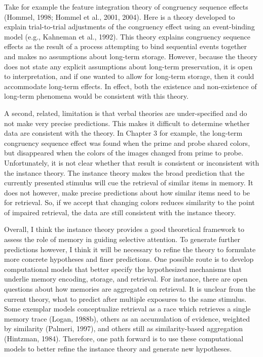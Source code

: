 \documentclass[]{DissertateCUNY}
\begin{document}
Take for example the feature integration theory of congruency sequence
effects (Hommel, 1998; Hommel et al., 2001, 2004). Here is a theory
developed to explain trial-to-trial adjustments of the congruency effect
using an event-binding model (e.g., Kahneman et al., 1992). This theory
explains congruency sequence effects as the result of a process
attempting to bind sequential events together and makes no assumptions
about long-term storage. However, because the theory does not state any
explicit assumptions about long-term preservation, it is open to
interpretation, and if one wanted to allow for long-term storage, then
it could accommodate long-term effects. In effect, both the existence
and non-existence of long-term phenomena would be consistent with this
theory.

A second, related, limitation is that verbal theories are
under-specified and do not make very precise predictions. This makes it
difficult to determine whether data are consistent with the theory. In
Chapter 3 for example, the long-term congruency sequence effect was
found when the prime and probe shared colors, but disappeared when the
colors of the images changed from prime to probe. Unfortunately, it is
not clear whether that result is consistent or inconsistent with the
instance theory. The instance theory makes the broad prediction that the
currently presented stimulus will cue the retrieval of similar items in
memory. It does not however, make precise predictions about how similar
items need to be for retrieval. So, if we accept that changing colors
reduces similarity to the point of impaired retrieval, the data are
still consistent with the instance theory.

Overall, I think the instance theory provides a good theoretical
framework to assess the role of memory in guiding selective attention.
To generate further predictions however, I think it will be necessary to
refine the theory to formulate more concrete hypotheses and finer
predictions. One possible route is to develop computational models that
better specify the hypothesized mechanisms that underlie memory
encoding, storage, and retrieval. For instance, there are open questions
about how memories are aggregated on retrieval. It is unclear from the
current theory, what to predict after multiple exposures to the same
stimulus. Some exemplar models conceptualize retrieval as a race which
retrieves a single memory trace (Logan, 1988b), others as an
accumulation of evidence, weighted by similarity (Palmeri, 1997), and
others still as similarity-based aggregation (Hintzman, 1984).
Therefore, one path forward is to use these computational models to
better refine the instance theory and generate new hypotheses.
\end{document}

